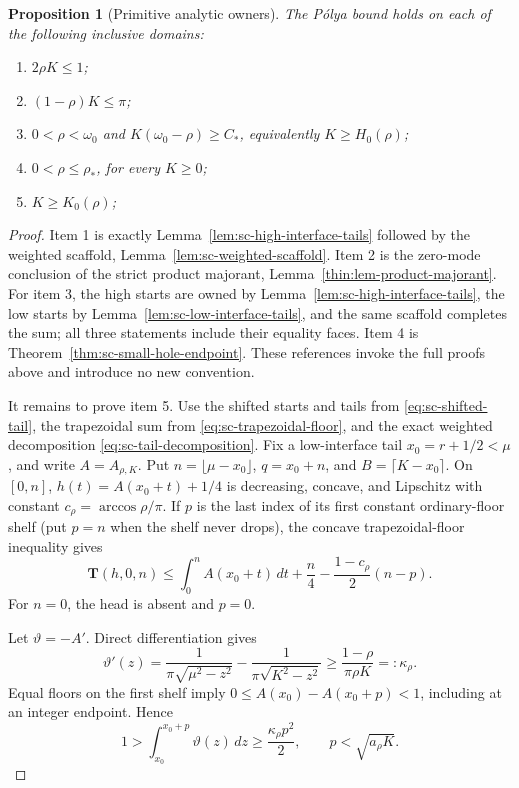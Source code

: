 \documentclass[11pt]{article}
\numberwithin{equation}{section}
\newtheorem{proposition}[theorem]{Proposition}
\theoremstyle{definition}
\theoremstyle{remark}
\begin{document}
\begin{proposition}[Primitive analytic owners]
\label{cm:prop-primitive-owners}
The P\'olya bound holds on each of the following inclusive domains:
\begin{enumerate}
\item \(2\rho K\leq1\);
\item \((1-\rho)K\leq\pi\);
\item \(0<\rho<\omega_0\) and
      \(K(\omega_0-\rho)\geq C_*\), equivalently \(K\geq H_0(\rho)\);
\item \(0<\rho\leq\rho_*\), for every \(K\geq0\);
\item \(K\geq K_0(\rho)\);
\end{enumerate}
\end{proposition}

\begin{proof}
Item 1 is exactly Lemma~\ref{lem:sc-high-interface-tails} followed by the
weighted scaffold, Lemma~\ref{lem:sc-weighted-scaffold}.  Item 2 is the
zero-mode conclusion of the strict product majorant,
Lemma~\ref{thin:lem-product-majorant}.  For item 3, the high starts are owned
by Lemma~\ref{lem:sc-high-interface-tails}, the low starts by
Lemma~\ref{lem:sc-low-interface-tails}, and the same scaffold completes the
sum; all three statements include their equality faces.  Item 4 is
Theorem~\ref{thm:sc-small-hole-endpoint}.  These references invoke the full
proofs above and introduce no new convention.

It remains to prove item 5.  Use the shifted starts and tails from
\eqref{eq:sc-shifted-tail}, the trapezoidal sum from
\eqref{eq:sc-trapezoidal-floor}, and the exact weighted decomposition
\eqref{eq:sc-tail-decomposition}.  Fix a low-interface tail
\(x_0=r+1/2<\mu\), and write \(A=A_{\rho,K}\).
Put \(n=\lfloor\mu-x_0\rfloor\), \(q=x_0+n\), and
\(B=\lceil K-x_0\rceil\).  On \([0,n]\),
\(h(t)=A(x_0+t)+1/4\) is decreasing, concave, and Lipschitz with
constant \(c_\rho=\arccos\rho/\pi\).  If \(p\) is the last index of its
first constant ordinary-floor shelf (put \(p=n\) when the shelf never
drops), the concave trapezoidal-floor inequality gives
\begin{equation}
 \mathbf T(h,0,n)
 \leq\int_0^nA(x_0+t)\,dt+\frac n4
 -\frac{1-c_\rho}{2}(n-p).
 \label{cm:eq-fixed-head}
\end{equation}
For \(n=0\), the head is absent and \(p=0\).

Let \(\vartheta=-A'\).  Direct differentiation gives
\[
 \vartheta'(z)=\frac1{\pi\sqrt{\mu^2-z^2}}
 -\frac1{\pi\sqrt{K^2-z^2}}
 \geq\frac{1-\rho}{\pi\rho K}=:\kappa_\rho.
\]
Equal floors on the first shelf imply
\(0\leq A(x_0)-A(x_0+p)<1\), including at an integer endpoint.  Hence
\[
 1>\int_{x_0}^{x_0+p}\vartheta(z)\,dz
 \geq\frac{\kappa_\rho p^2}{2},
 \qquad p<\sqrt{a_\rho K}.
\]


\end{proof}
\end{document}

